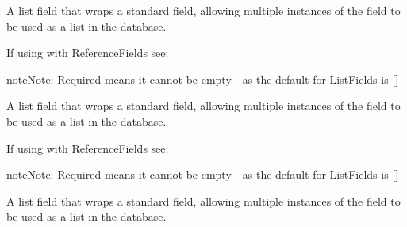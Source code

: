 \documentclass[letterpaper,10pt,english]{sphinxmanual}
\begin{document}
\begin{fulllineitems}
\begin{fulllineitems}
\end{fulllineitems}


\begin{fulllineitems}
\label{\detokenize{user:user.User.objects}}
\end{fulllineitems}


\begin{fulllineitems}
\label{\detokenize{user:user.User.questionnaire}}
A list field that wraps a standard field, allowing multiple instances
of the field to be used as a list in the database.

If using with ReferenceFields see: 

\begin{sphinxadmonition}{note}{Note:}
Required means it cannot be empty - as the default for ListFields is {[}{]}
\end{sphinxadmonition}

\end{fulllineitems}


\begin{fulllineitems}
\label{\detokenize{user:user.User.read_sources}}
A list field that wraps a standard field, allowing multiple instances
of the field to be used as a list in the database.

If using with ReferenceFields see: 

\begin{sphinxadmonition}{note}{Note:}
Required means it cannot be empty - as the default for ListFields is {[}{]}
\end{sphinxadmonition}

\end{fulllineitems}


\begin{fulllineitems}
\label{\detokenize{user:user.User.sessions}}
A list field that wraps a standard field, allowing multiple instances
of the field to be used as a list in the database.


\end{fulllineitems}
\end{fulllineitems}
\end{document}

